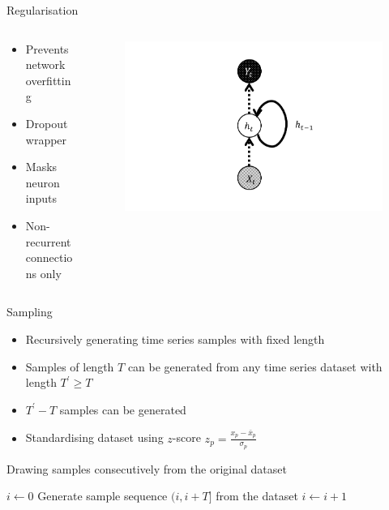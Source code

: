 \documentclass{beamer}
\begin{document}
\begin{frame}{Regularisation}
\begin{columns}[T] %
\begin{column}{.58\textwidth}
\begin{itemize}
  \item Prevents network overfitting
  \item Dropout wrapper \cite{srivastava2014}
  \item Masks neuron inputs
  \item Non-recurrent connections only \cite{zaremba2014}
\end{itemize}
\end{column}%
\hfill%
\begin{column}{.38\textwidth}
\begin{figure}[H]
	\centering
	\includegraphics[width=1\textwidth]{dropout.PNG}
\end{figure}
\end{column}%
\end{columns}
\end{frame}

\begin{frame}[shrink]{Sampling}
  \begin{itemize}
    \item Recursively generating time series samples with fixed length
    \item Samples of length \(T\) can be generated from any time series dataset with length \(T^{'} \geq T \)
    \item \(T^{'}-T\) samples can be generated
    \item Standardising dataset using \(z\)-score \( z_p=\frac{x_p-\bar{x}_p}{\sigma_p} \)
  \end{itemize}
  
  \begin{algorithm}[H]
  	\label{consecutive_sampling}
  	\caption{Drawing samples consecutively from the original dataset}
  	\(i\leftarrow 0\) \;
  	 {
  		Generate sample sequence \((i, i+T]\) from the dataset\;
  		\(i\leftarrow i+1\)\;
  	}
  \end{algorithm}
\end{frame}
\end{document}
